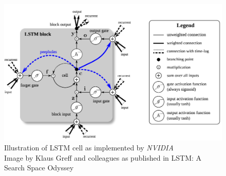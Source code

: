 \documentclass[12pt, a4paper]{article}
\begin{document}
\begin{figure}[ht]
	\centering
	\begin{adjustbox}{center}
		\includegraphics[width=1\textwidth]{LSTM.png}
	\end{adjustbox}
	\caption{Illustration of LSTM cell as implemented by \textit{NVIDIA}\\Image by Klaus Greff and colleagues as published in LSTM: A Search Space Odyssey \citep{greff2017lstm}}\label{lstm}
\end{figure}
\end{document}
